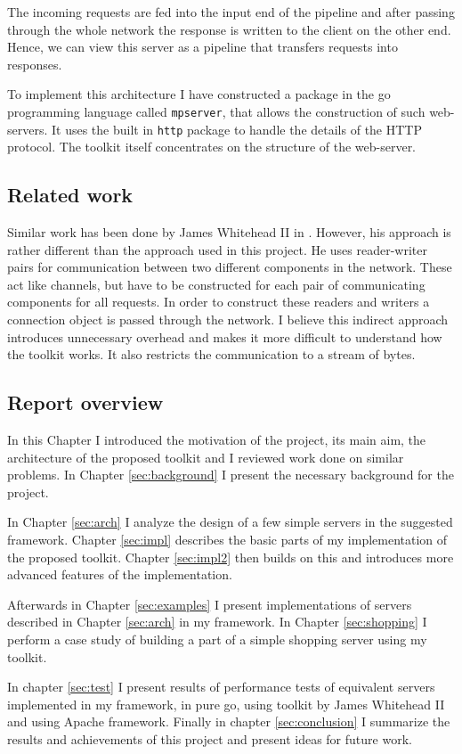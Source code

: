 The incoming requests are fed into the input end of the pipeline and 
after passing through the whole network the response is written to the
client on the other end. Hence, we can view this server
as a pipeline that transfers requests into responses.

To implement this architecture I have constructed a package in the go programming 
language called \texttt{mpserver}, that allows the construction of such web-servers.
It uses the built in \texttt{http} package to handle the details of
the HTTP \cite{http} protocol. The toolkit itself concentrates on the 
structure of the web-server.

\subsection{Related work}
Similar work has been done by James Whitehead II in \cite{whitehead}.
However, his approach is rather different than the approach used 
in this project. He uses reader-writer pairs for communication between
two different components in the network. These act like channels, but
have to be constructed for each pair of communicating components
for all requests.
In order to construct these readers and writers a connection object is 
passed through the network.
I believe this indirect approach introduces unnecessary overhead and 
makes it more difficult to understand how the toolkit works.
It also restricts the communication to a stream of bytes.

\subsection{Report overview}
In this Chapter I introduced the motivation of the project, its main
aim, the architecture of the proposed toolkit and I reviewed work done
on similar problems. In Chapter \ref{sec:background}
I present the necessary background for the project.

In Chapter \ref{sec:arch} I analyze the design of a few simple servers
in the suggested framework. Chapter \ref{sec:impl} describes the basic parts of 
my implementation of the proposed toolkit. Chapter \ref{sec:impl2} then builds
on this and introduces more advanced features of the implementation.

Afterwards in Chapter \ref{sec:examples} I present
implementations of servers described in Chapter \ref{sec:arch} in my framework.
In Chapter \ref{sec:shopping} I perform a case study of building
a part of a simple shopping server using my toolkit.

In chapter \ref{sec:test} I present results of performance tests of equivalent 
servers implemented in my framework, in pure go, using toolkit by James Whitehead II
\cite{whitehead} and using Apache framework. Finally in chapter 
\ref{sec:conclusion} I summarize the results and achievements of this 
project and present ideas for future work.